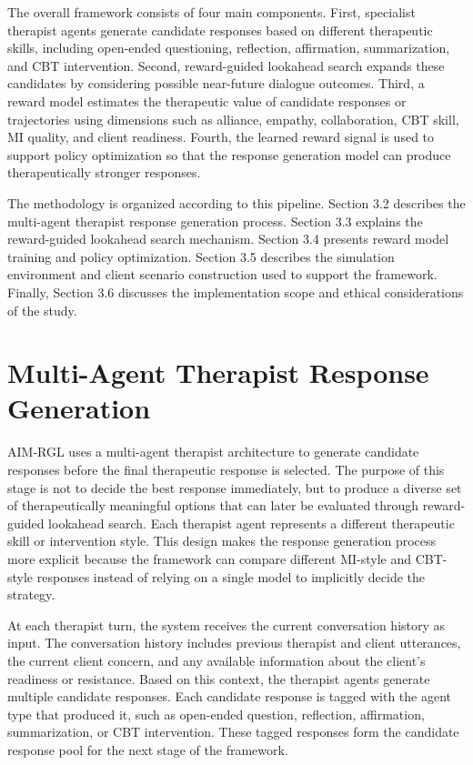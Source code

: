 The overall framework consists of four main components. First, specialist therapist agents generate candidate responses based on different therapeutic skills, including open-ended questioning, reflection, affirmation, summarization, and CBT intervention. Second, reward-guided lookahead search expands these candidates by considering possible near-future dialogue outcomes. Third, a reward model estimates the therapeutic value of candidate responses or trajectories using dimensions such as alliance, empathy, collaboration, CBT skill, MI quality, and client readiness. Fourth, the learned reward signal is used to support policy optimization so that the response generation model can produce therapeutically stronger responses.

The methodology is organized according to this pipeline. Section 3.2 describes the multi-agent therapist response generation process. Section 3.3 explains the reward-guided lookahead search mechanism. Section 3.4 presents reward model training and policy optimization. Section 3.5 describes the simulation environment and client scenario construction used to support the framework. Finally, Section 3.6 discusses the implementation scope and ethical considerations of the study.

\section{Multi-Agent Therapist Response Generation}

AIM-RGL uses a multi-agent therapist architecture to generate candidate responses before the final therapeutic response is selected. The purpose of this stage is not to decide the best response immediately, but to produce a diverse set of therapeutically meaningful options that can later be evaluated through reward-guided lookahead search. Each therapist agent represents a different therapeutic skill or intervention style. This design makes the response generation process more explicit because the framework can compare different MI-style and CBT-style responses instead of relying on a single model to implicitly decide the strategy.

At each therapist turn, the system receives the current conversation history as input. The conversation history includes previous therapist and client utterances, the current client concern, and any available information about the client’s readiness or resistance. Based on this context, the therapist agents generate multiple candidate responses. Each candidate response is tagged with the agent type that produced it, such as open-ended question, reflection, affirmation, summarization, or CBT intervention. These tagged responses form the candidate response pool for the next stage of the framework.

